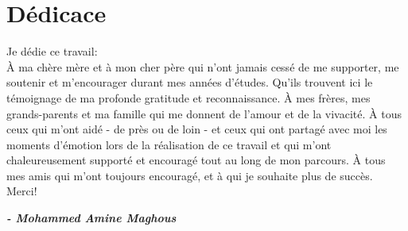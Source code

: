 \chapter*{Dédicace}

\begin{fquote}
\begin{center}
\large{
Je dédie ce travail:\\[12pt]
\uppercase{à} ma chère mère et à mon cher père qui n'ont jamais cessé de me supporter, me soutenir et m'encourager durant mes années d'études.
Qu'ils trouvent ici le témoignage de ma profonde gratitude et reconnaissance.
\uppercase{à} mes frères, mes grands-parents et ma famille qui me donnent de l'amour et de la vivacité.
\uppercase{à} tous ceux qui m'ont aidé - de près ou de loin - et ceux qui ont partagé avec moi les moments d'émotion lors de la réalisation de ce travail et qui m'ont chaleureusement supporté et encouragé tout au long de mon parcours.
\uppercase{à} tous mes amis qui m'ont toujours encouragé, et à qui je souhaite plus de succès.\\
Merci!
}
\end{center}
\bigskip
\medskip
\end{fquote}

\begin{adjustwidth}{2cm}{1cm}
\hspace*{\fill} \textbf{\textit{\large{- Mohammed Amine Maghous}}}
\end{adjustwidth}

\clearpage